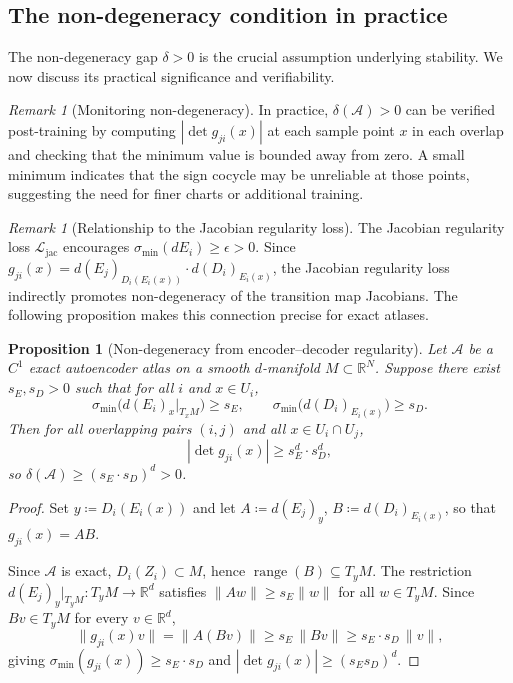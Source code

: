 \documentclass[11pt]{article}
\newcommand{\R}{\mathbb{R}}
\theoremstyle{plain}
\newtheorem{proposition}[theorem]{Proposition}
\theoremstyle{definition}
\theoremstyle{remark}
\newtheorem{remark}[theorem]{Remark}
\begin{document}
\subsection{The non-degeneracy condition in practice}

The non-degeneracy gap $\delta > 0$ is the crucial assumption underlying stability. We now discuss its practical significance and verifiability.

\begin{remark}[Monitoring non-degeneracy]\label{rem:monitoring}
In practice, $\delta(\mathcal{A}) > 0$ can be verified post-training by computing $|\det g_{ji}(x)|$ at each sample point $x$ in each overlap and checking that the minimum value is bounded away from zero. A small minimum indicates that the sign cocycle may be unreliable at those points, suggesting the need for finer charts or additional training.
\end{remark}

\begin{remark}[Relationship to the Jacobian regularity loss]
The Jacobian regularity loss $\mathcal{L}_{\mathrm{jac}}$ encourages $\sigma_{\min}(d E_i) \geq \epsilon > 0$. Since $g_{ji}(x) = d(E_j)_{D_i(E_i(x))} \cdot d(D_i)_{E_i(x)}$, the Jacobian regularity loss indirectly promotes non-degeneracy of the transition map Jacobians. The following proposition makes this connection precise for exact atlases.
\end{remark}

\begin{proposition}[Non-degeneracy from encoder--decoder regularity]\label{prop:nondeg-bound}
Let $\mathcal{A}$ be a $C^1$ exact autoencoder atlas on a smooth $d$-manifold $M \subset \R^N$. Suppose there exist $s_E, s_D > 0$ such that for all $i$ and $x \in U_i$,
\[
\sigma_{\min}\bigl(d(E_i)_x|_{T_xM}\bigr) \geq s_E, \qquad \sigma_{\min}\bigl(d(D_i)_{E_i(x)}\bigr) \geq s_D.
\]
Then for all overlapping pairs $(i,j)$ and all $x \in U_i \cap U_j$,
\[
|\det g_{ji}(x)| \geq s_E^d \cdot s_D^d,
\]
so $\delta(\mathcal{A}) \geq (s_E \cdot s_D)^d > 0$.
\end{proposition}

\begin{proof}
Set $y \coloneqq D_i(E_i(x))$ and let $A \coloneqq d(E_j)_y$, $B \coloneqq d(D_i)_{E_i(x)}$, so that $g_{ji}(x) = AB$.

Since $\mathcal{A}$ is exact, $D_i(Z_i) \subset M$, hence $\operatorname{range}(B) \subseteq T_y M$. The restriction $d(E_j)_y|_{T_yM} : T_yM \to \R^d$ satisfies $\|Aw\| \geq s_E \|w\|$ for all $w \in T_yM$. Since $Bv \in T_yM$ for every $v \in \R^d$,
\[
\|g_{ji}(x)v\| = \|A(Bv)\| \geq s_E\,\|Bv\| \geq s_E \cdot s_D\,\|v\|,
\]
giving $\sigma_{\min}(g_{ji}(x)) \geq s_E \cdot s_D$ and $|\det g_{ji}(x)| \geq (s_E s_D)^d$.
\end{proof}
\end{document}

